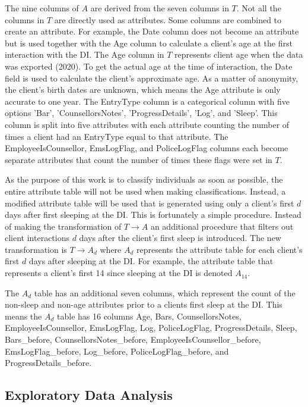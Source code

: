 The nine columns of $A$ are derived from the seven columns in $T$. Not all the columns in $T$ are directly used as attributes. Some columns are combined to create an attribute. For example, the Date column does not become an attribute but is used together with the Age column to calculate a client's age at the first interaction with the DI.
The Age column in $T$ represents client age when the data was exported (2020). To get the actual age at the time of interaction, the Date field is used to calculate the client's approximate age. As a matter of anonymity, the client's birth dates are unknown, which means the Age attribute is only accurate to one year.
The EntryType column is a categorical column with five options 'Bar', 'CounsellorsNotes', 'ProgressDetails', 'Log', and 'Sleep'. This column is split into five attributes with each attribute counting the number of times a client had an EntryType equal to that attribute.
The EmployeeIsCounsellor, EmsLogFlag, and PoliceLogFlag columns each become separate attributes that count the number of times these flags were set in $T$.


As the purpose of this work is to classify individuals as soon as possible, the entire attribute table will not be used when making classifications. Instead, a modified attribute table will be used that is generated using only a client's first $d$ days after first sleeping at the DI. 
This is fortunately a simple procedure. Instead of making the transformation of $T \rightarrow A$ an additional procedure that filters out client interactions $d$ days after the client's first sleep is introduced. The new transformation is $T \rightarrow A_d$ where $A_d$ represents the attribute table for each client's first $d$ days after sleeping at the DI. For example, the attribute table that represents a client's first 14 since sleeping at the DI is denoted $A_{14}$.

 The $A_d$ table has an additional seven columns, which represent the count of the non-sleep and non-age attributes prior to a clients first sleep at the DI. This means the $A_d$ table has 16 columns Age, Bars, CounsellorsNotes, EmployeeIsCounsellor, EmsLogFlag, Log, PoliceLogFlag, ProgressDetails, Sleep, Bars\_before, CounsellorsNotes\_before, EmployeeIsCounsellor\_before, EmsLogFlag\_before, Log\_before, PoliceLogFlag\_before, and ProgressDetails\_before.


\subsection{Exploratory Data Analysis} \label{chap:data:characteristics}

